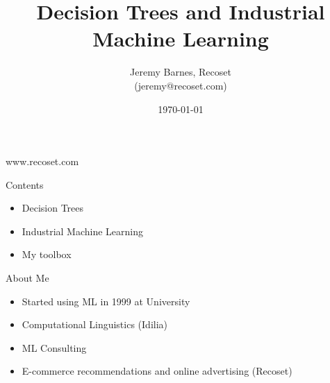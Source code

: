 \documentclass{beamer}
\title{Decision Trees and Industrial Machine Learning}
\author{Jeremy Barnes, Recoset \\ (jeremy@recoset.com)}
\date{\today}
\begin{document}
\begin{frame}
  \titlepage
  \begin{center}
    www.recoset.com \\
  \end{center}
\end{frame}

\begin{frame}{Contents}
  \begin{itemize}
  \item Decision Trees
  \item Industrial Machine Learning
  \item My toolbox
  \end{itemize}
\end{frame}

\begin{frame}{About Me}
  
  \begin{itemize}
  \item Started using ML in 1999 at University
  \item Computational Linguistics (Idilia)
  \item ML Consulting
  \item E-commerce recommendations and online advertising (Recoset)
  \end{itemize}

\end{frame}


\begin{frame}

  \begin{center}
  \end{center}

\end{frame}

\begin{frame}

  \begin{center}
  \end{center}

\end{frame}

\begin{frame}

  \begin{center}
  \end{center}

\end{frame}
\end{document}

